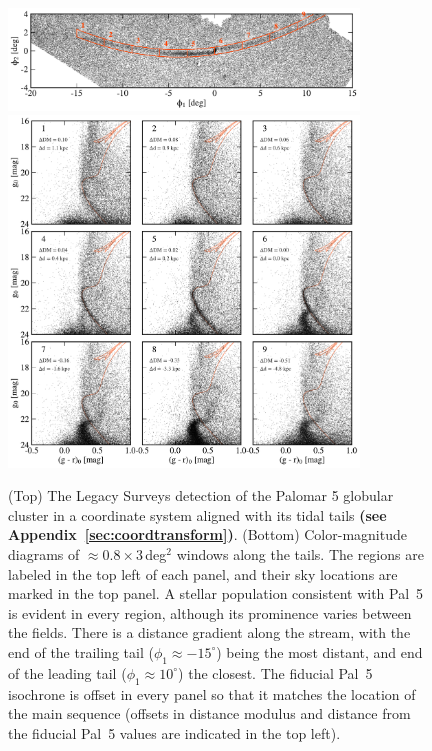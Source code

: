 \documentclass[twocolumn]{aastex62}
\newcommand{\changes}[1]{{\textbf{#1}}}
\begin{document}
\begin{figure}
\begin{center}
\includegraphics[width=0.83\textwidth]{fig1_a_map.pdf}
\includegraphics[width=0.83\textwidth]{fig1_b_cmds.pdf}
\end{center}
\caption{
(Top) The Legacy Surveys detection of the Palomar 5 globular cluster in a
coordinate system aligned with its tidal tails \changes{(see
Appendix~\ref{sec:coordtransform})}.
(Bottom) Color-magnitude diagrams of $\approx0.8\times3$\,deg$^2$ windows along the tails.
The regions are labeled in the top left of each panel, and their sky locations are marked in the top panel.
A stellar population consistent with Pal~5 is evident in every region, although its prominence varies between the fields.
There is a distance gradient along the stream, with the end of the trailing tail ($\phi_1\approx-15^\circ$) being the most distant, and end of the leading tail ($\phi_1\approx10^\circ$) the closest.
The fiducial Pal~5 isochrone is offset in every panel so that it matches the location of the main sequence (offsets in distance modulus and distance from the fiducial Pal~5 values are indicated in the top left).
}
\label{fig:cmds}
\end{figure}
\end{document}
